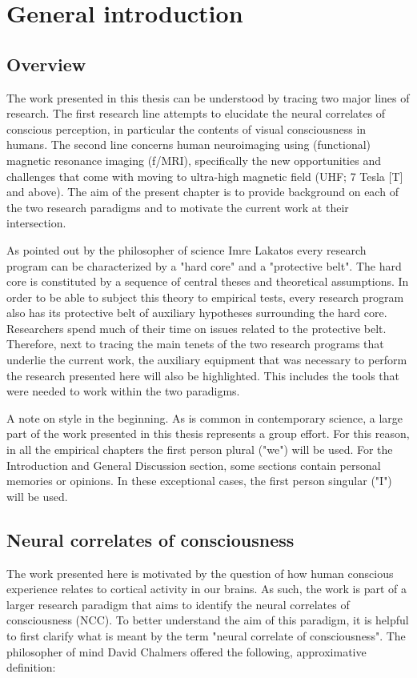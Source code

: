 \chapter{General introduction}

\clearpage{\thispagestyle{empty}\cleardoublepage}

\section{Overview}
The work presented in this thesis can be understood by tracing two major lines of research. The first research line attempts to elucidate the neural correlates of conscious perception, in particular the contents of visual consciousness in humans. The second line concerns human neuroimaging using (functional) magnetic resonance imaging (f/MRI), specifically the new opportunities and challenges that come with moving to ultra-high magnetic field (UHF; 7 Tesla [T] and above). The aim of the present chapter is to provide background on each of the two research paradigms and to motivate the current work at their intersection.

As pointed out by the philosopher of science Imre Lakatos \parencite*{Lakatos1970} every research program can be characterized by a "hard core" and a "protective belt". The hard core is constituted by a sequence of central theses and theoretical assumptions. In order to be able to subject this theory to empirical tests, every research program also has its protective belt of auxiliary hypotheses surrounding the hard core. Researchers spend much of their time on issues related to the protective belt. Therefore, next to tracing the main tenets of the two research programs that underlie the current work, the auxiliary equipment that was necessary to perform the research presented here will also be highlighted. This includes the tools that were needed to work within the two paradigms.

A note on style in the beginning. As is common in contemporary science, a large part of the work presented in this thesis represents a group effort. For this reason, in all the empirical chapters the first person plural ("we") will be used. For the Introduction and General Discussion section, some sections contain personal memories or opinions. In these exceptional cases, the first person singular ("I") will be used.

\section{Neural correlates of consciousness}
The work presented here is motivated by the question of how human conscious experience relates to cortical activity in our brains. As such, the work is part of a larger research paradigm that aims to identify the neural correlates of consciousness (NCC). To better understand the aim of this paradigm, it is helpful to first clarify what is meant by the term "neural correlate of consciousness". The philosopher of mind David Chalmers \parencite*{Chalmers2000} offered the following, approximative definition:

